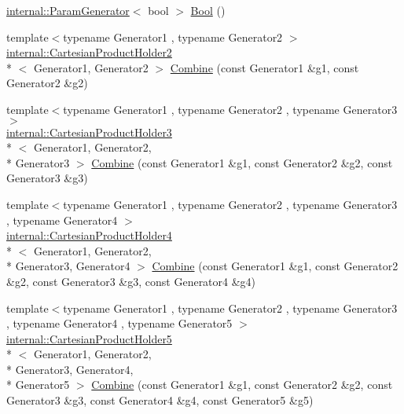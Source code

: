 \begin{DoxyCompactItemize}
\item 
\hyperlink{classtesting_1_1internal_1_1_param_generator}{internal\-::\-Param\-Generator}$<$ bool $>$ \hyperlink{namespacetesting_aa9f9150ed43f949c8a6bacf3f04c03ce}{Bool} ()
\item 
{\footnotesize template$<$typename Generator1 , typename Generator2 $>$ }\\\hyperlink{classtesting_1_1internal_1_1_cartesian_product_holder2}{internal\-::\-Cartesian\-Product\-Holder2}\\*
$<$ Generator1, Generator2 $>$ \hyperlink{namespacetesting_a4917922963bacef3e301e67366c41df3}{Combine} (const Generator1 \&g1, const Generator2 \&g2)
\item 
{\footnotesize template$<$typename Generator1 , typename Generator2 , typename Generator3 $>$ }\\\hyperlink{classtesting_1_1internal_1_1_cartesian_product_holder3}{internal\-::\-Cartesian\-Product\-Holder3}\\*
$<$ Generator1, Generator2, \\*
Generator3 $>$ \hyperlink{namespacetesting_a77b89180fd846e275236409d9704eda2}{Combine} (const Generator1 \&g1, const Generator2 \&g2, const Generator3 \&g3)
\item 
{\footnotesize template$<$typename Generator1 , typename Generator2 , typename Generator3 , typename Generator4 $>$ }\\\hyperlink{classtesting_1_1internal_1_1_cartesian_product_holder4}{internal\-::\-Cartesian\-Product\-Holder4}\\*
$<$ Generator1, Generator2, \\*
Generator3, Generator4 $>$ \hyperlink{namespacetesting_abf420810fcd8190a98c2927862805a3f}{Combine} (const Generator1 \&g1, const Generator2 \&g2, const Generator3 \&g3, const Generator4 \&g4)
\item 
{\footnotesize template$<$typename Generator1 , typename Generator2 , typename Generator3 , typename Generator4 , typename Generator5 $>$ }\\\hyperlink{classtesting_1_1internal_1_1_cartesian_product_holder5}{internal\-::\-Cartesian\-Product\-Holder5}\\*
$<$ Generator1, Generator2, \\*
Generator3, Generator4, \\*
Generator5 $>$ \hyperlink{namespacetesting_a81505186d64f5b5763a0e268bc2e5650}{Combine} (const Generator1 \&g1, const Generator2 \&g2, const Generator3 \&g3, const Generator4 \&g4, const Generator5 \&g5)
\item 

\end{DoxyCompactItemize}
